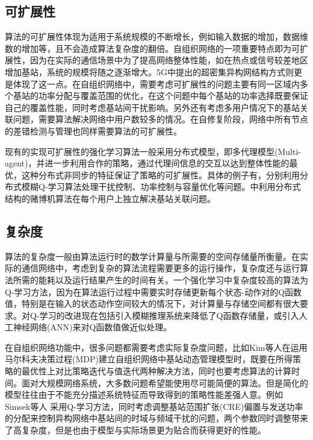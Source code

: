 \documentclass{IEEEtran}
\begin{document}
\subsection{可扩展性}
算法的可扩展性体现为适用于系统规模的不断增长，例如输入数据的增加，数据维数的增加等，且不会造成算法复杂度的翻倍。自组织网络的一项重要特点即为可扩展性，因为在实际的通信场景中为了提高网络整体性能，如在热点或信号较差地区增加基站，系统的规模将随之逐渐增大。5G中提出的超密集异构网结构方式则更是体现了这一点。在自组织网络中，需要考虑可扩展性的问题主要有同一区域内多个基站的功率分配与覆盖范围的优化，在这个问题中每个基站的功率选择既要保证自己的覆盖性能，同时考虑基站间干扰影响。另外还有考虑多用户情况下的基站关联问题，需要算法解决网络中用户数较多的情况。在自修复阶段，网络中所有节点的差错检测与管理也同样需要算法的可扩展性。

现有的实现可扩展性的强化学习算法一般采用分布式模型，即多代理模型(Multi-agent)，并进一步利用合作的策略，通过代理间信息的交互以达到整体性能的最优，这种分布式非同步的特征保证了策略的可扩展性。具体的例子有\cite{Dirani2010}\cite{Fan2014}\cite{Islam2012}，分别利用分布式模糊Q-学习算法处理干扰控制、功率控制与容量优化等问题。\cite{Maghsudi2017}中利用分布式结构的赌博机算法在每个用户上独立解决基站关联问题。

\subsection{复杂度}
算法的复杂度一般由算法运行时的数学计算量与所需要的空间存储量所衡量。在实际的通信网络中，考虑到复杂的算法流程需要更多的运行操作，复杂度还与运行算法所需的能耗以及运行结果产生的时间有关。一个强化学习中复杂度较高的算法为Q-学习方法，因为在算法运行过程中需要实时存储更新每个状态-动作对的Q函数值，特别是在输入的状态动作空间较大的情况下，对计算量与存储空间都有很大要求。对Q-学习的改进现在包括引入模糊推理系统来降低了Q函数存储量，或引入人工神经网络(ANN)来对Q函数值做近似处理\cite{Ghadimi2017}。

在自组织网络功能中，很多问题都需要考虑实际复杂度问题，比如Kim等人\cite{Kim2014}在运用马尔科夫决策过程(MDP)建立自组织网络中基站动态管理模型时，既要在所得策略的最优性上对比策略迭代与值迭代两种解决方法，同时也要考虑算法的计算时间。面对大规模网络系统，大多数问题希望能使用尽可能简便的算法。但是简化的模型往往由于不能充分描述系统特征而导致得到的策略性能差强人意。例如Simsek等人\cite{Simsek2015} 采用Q-学习方法，同时考虑调整基站范围扩张(CRE)偏置与发送功率的分配来控制异构网络中基站间的时域与频域干扰的问题，两个参数同时调整带来了高复杂度，但是也由于模型与实际场景更为贴合而获得更好的性能。
\end{document}
